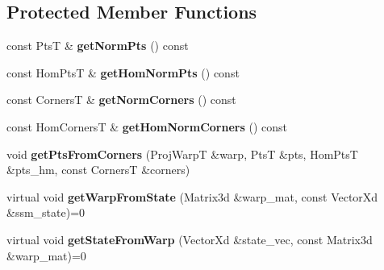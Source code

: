 \subsection*{Protected Member Functions}
\begin{DoxyCompactItemize}
\item 
\hypertarget{classProjectiveBase_a13b4da2565e0ccbc817e3dfd9edae358}{const Pts\-T \& {\bfseries get\-Norm\-Pts} () const }\label{classProjectiveBase_a13b4da2565e0ccbc817e3dfd9edae358}

\item 
\hypertarget{classProjectiveBase_af0b9aba5d19191c4a28fad0784f558f6}{const Hom\-Pts\-T \& {\bfseries get\-Hom\-Norm\-Pts} () const }\label{classProjectiveBase_af0b9aba5d19191c4a28fad0784f558f6}

\item 
\hypertarget{classProjectiveBase_a7806c08154c60374cef7512d93d56533}{const Corners\-T \& {\bfseries get\-Norm\-Corners} () const }\label{classProjectiveBase_a7806c08154c60374cef7512d93d56533}

\item 
\hypertarget{classProjectiveBase_ac57e5fd8e33ee87801c59f977778d0b0}{const Hom\-Corners\-T \& {\bfseries get\-Hom\-Norm\-Corners} () const }\label{classProjectiveBase_ac57e5fd8e33ee87801c59f977778d0b0}

\item 
\hypertarget{classProjectiveBase_a1160c2f8a47f2f0e0a09b0c308ddcf58}{void {\bfseries get\-Pts\-From\-Corners} (Proj\-Warp\-T \&warp, Pts\-T \&pts, Hom\-Pts\-T \&pts\-\_\-hm, const Corners\-T \&corners)}\label{classProjectiveBase_a1160c2f8a47f2f0e0a09b0c308ddcf58}

\item 
\hypertarget{classProjectiveBase_a48a4af195e56dfb100dc2983bb48e59c}{virtual void {\bfseries get\-Warp\-From\-State} (Matrix3d \&warp\-\_\-mat, const Vector\-Xd \&ssm\-\_\-state)=0}\label{classProjectiveBase_a48a4af195e56dfb100dc2983bb48e59c}

\item 
\hypertarget{classProjectiveBase_a7366bb9a0073f4d644df39e9c5d486c4}{virtual void {\bfseries get\-State\-From\-Warp} (Vector\-Xd \&state\-\_\-vec, const Matrix3d \&warp\-\_\-mat)=0}\label{classProjectiveBase_a7366bb9a0073f4d644df39e9c5d486c4}

\end{DoxyCompactItemize}

